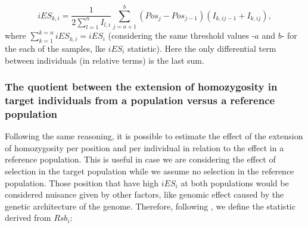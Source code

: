 \documentclass[a4paper,11pt]{article}
\begin{document}
 \begin{equation}
 iES_{k,i} = \frac{1}{2\sum_{l=1}^{n}I_{l,i}} \sum_{j=a+1}^{b} (Pos_{j} - Pos_{j-1}) (I_{k,ij-1} + I_{k,ij}),
 \end{equation}
where $\sum_{k=1}^{k=n}iES_{k,i}=iES_i$ (considering the same threshold values -$a$ and $b$- for the each of the samples, lke $iES_i$ statistic). Here the only differential term between individuals (in relative terms) is the last sum. %



\subsubsection{The quotient between the extension of homozygosity in target individuals from a population versus a reference population}
Following the same reasoning, it is possible to estimate the effect of the extension of homozygosity per position and per individual in relation to the effect in a reference population. This is useful in case we are considering the effect of selection in the target population while we assume no selection in the reference population. Those position that have high $iES_i$ at both populations would be considered nuisance given by other factors, like genomic effect caused by the genetic architecture of the genome. Therefore, following \citet{Tang:2007by}, we define the statistic derived from $Rsb_i$:
\end{document}
